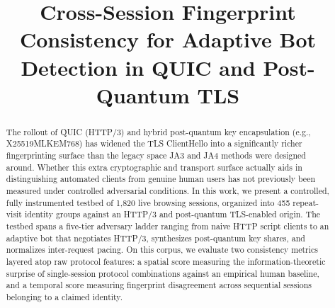\documentclass[conference]{IEEEtran}
\begin{document}
\title{Cross-Session Fingerprint Consistency for Adaptive Bot Detection in QUIC and Post-Quantum TLS}

\author{
}

\maketitle

\begin{abstract}
The rollout of QUIC (HTTP/3) and hybrid post-quantum key encapsulation (e.g., X25519MLKEM768) has widened the TLS ClientHello into a significantly richer fingerprinting surface than the legacy space JA3 and JA4 methods were designed around. Whether this extra cryptographic and transport surface actually aids in distinguishing automated clients from genuine human users has not previously been measured under controlled adversarial conditions. In this work, we present a controlled, fully instrumented testbed of 1,820 live browsing sessions, organized into 455 repeat-visit identity groups against an HTTP/3 and post-quantum TLS-enabled origin. The testbed spans a five-tier adversary ladder ranging from naive HTTP script clients to an adaptive bot that negotiates HTTP/3, synthesizes post-quantum key shares, and normalizes inter-request pacing. On this corpus, we evaluate two consistency metrics layered atop raw protocol features: a spatial score measuring the information-theoretic surprise of single-session protocol combinations against an empirical human baseline, and a temporal score measuring fingerprint disagreement across sequential sessions belonging to a claimed identity.


\end{abstract}
\end{document}
